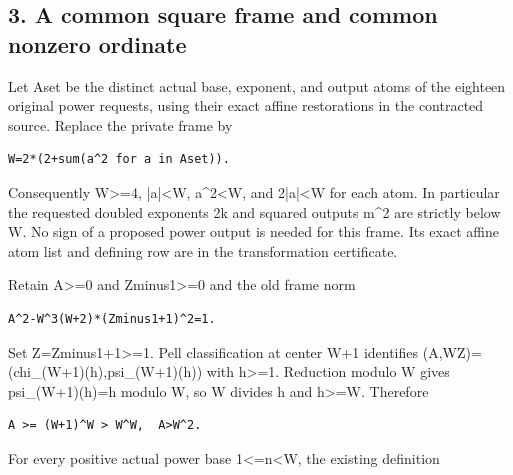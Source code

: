 \subsection*{3. A common square frame and common nonzero ordinate}



Let Aset be the distinct actual base, exponent, and output atoms of the eighteen original power requests, using their exact affine restorations in the contracted source. Replace the private frame by



\begin{verbatim}
W=2*(2+sum(a^2 for a in Aset)).
\end{verbatim}

Consequently W\textgreater{}\allowbreak{}=\allowbreak{}4, |a|\textless{}\allowbreak{}W, a\textasciicircum{}\allowbreak{}2\textless{}\allowbreak{}W, and 2|a|\textless{}\allowbreak{}W for each atom. In particular the requested doubled exponents 2k and squared outputs m\textasciicircum{}\allowbreak{}2 are strictly below W. No sign of a proposed power output is needed for this frame. Its exact affine atom list and defining row are in the transformation certificate.



Retain A\textgreater{}\allowbreak{}=\allowbreak{}0 and Zminus1\textgreater{}\allowbreak{}=\allowbreak{}0 and the old frame norm



\begin{verbatim}
A^2-W^3(W+2)*(Zminus1+1)^2=1.
\end{verbatim}

Set Z=\allowbreak{}Zminus1+\allowbreak{}1\textgreater{}\allowbreak{}=\allowbreak{}1. Pell classification at center W+\allowbreak{}1 identifies (A,WZ)=\allowbreak{}(chi\_\allowbreak{}(W+\allowbreak{}1)(h),psi\_\allowbreak{}(W+\allowbreak{}1)(h)) with h\textgreater{}\allowbreak{}=\allowbreak{}1. Reduction modulo W gives psi\_\allowbreak{}(W+\allowbreak{}1)(h)=\allowbreak{}h modulo W, so W divides h and h\textgreater{}\allowbreak{}=\allowbreak{}W. Therefore



\begin{verbatim}
A >= (W+1)^W > W^W,  A>W^2.
\end{verbatim}

For every positive actual power base 1\textless{}\allowbreak{}=\allowbreak{}n\textless{}\allowbreak{}W, the existing definition



